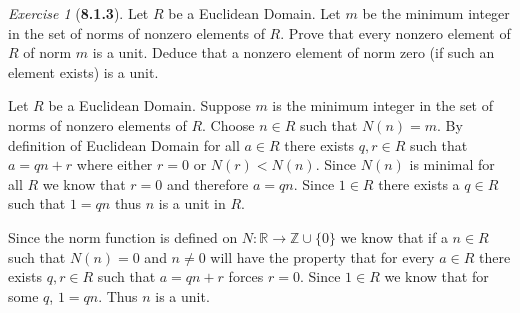 \documentclass[12pt]{amsart}
\makeatletter
\theoremstyle{remark}
\newtheorem*{exercise}{Exercise}%
\def\RR{\ensuremath{\mathbb R}} %
\def\ZZ{\ensuremath{\mathbb Z}}
\renewenvironment{proof}[1][\proofname]{\par\doublespacing
  \pushQED{\qed}%
  \normalfont \topsep6\p@\@plus6\p@\relax
  \list{}{%
    \settowidth{\leftmargin}{\itshape\proofname:\hskip\labelsep}%
    \setlength{\labelwidth}{0pt}%
    \setlength{\itemindent}{-\leftmargin}%
  }%
  \item[\hskip\labelsep\itshape#1\@addpunct{:}]\ignorespaces
}{%
  \popQED\endlist\@endpefalse
  \singlespacing
}
\theoremstyle{mycomment}
\makeatother
\begin{document}
\begin{exercise}[\textbf{8.1.3}] Let $R$ be a Euclidean Domain. Let $m$ be the minimum integer in the set of norms of nonzero 
  elements of $R$. Prove that every nonzero element of $R$ of norm $m$ is a unit. Deduce that a nonzero element of norm zero (if 
  such an element exists) is a unit.  
    \begin{proof} Let $R$ be a Euclidean Domain. Suppose $m$ is the minimum integer in the set of norms of nonzero 
      elements of $R$. Choose $n\in R$ such that $N(n) = m$. By definition of Euclidean Domain for all $a \in R$ 
      there exists $q, r \in R$ such that $a = qn + r$ where either $r = 0$ or $N(r) < N(n)$. Since $N(n)$ is minimal for all $R$
      we know that $r = 0$ and therefore $a = qn$. Since $1 \in R$ there exists a $q \in R$ such that $1 = qn$ thus $n$ is a unit in $R$.
      
      Since the norm function is defined on $N: \RR \to \ZZ \cup \{0\}$ we know that if a $n \in R$ such that $N(n) = 0$ and $n \neq 0$ will have the property 
      that for every $a \in R$ there exists $q, r \in R$ such that $a = qn + r$ forces $r = 0$. Since $1 \in R$ we know that for some $q$, $1 = qn$. Thus $n$ is a unit.   
       \end{proof}

\end{exercise}
\vspace{.5in}
\end{document}
